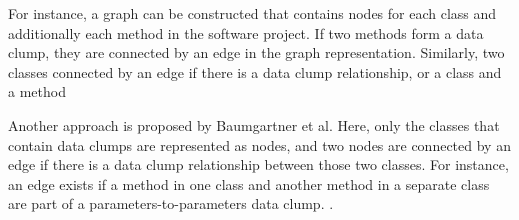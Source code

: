 For instance, a graph can be constructed that contains nodes for each class and additionally each method in the software project. If two methods form a data clump, they are connected by an edge in the graph representation. Similarly, two classes connected by an edge if there is a data clump relationship, or a class and a method   

Another approach is proposed by Baumgartner et al. Here, only the classes that contain data clumps are represented as nodes, and two nodes are connected by an edge if there is a data clump relationship between those two classes. For instance, an edge exists if a method in one class and another method in a separate class are part of a parameters-to-parameters data clump. \cite{data_clumps_baumgartner}.



